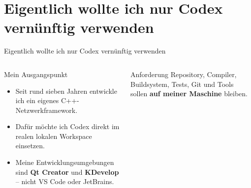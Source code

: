 \documentclass[\fhformat,10pt]{fh-ooe}
\newcommand{\CodexLink}{\href{https://github.com/openai/codex}{OpenAI Codex}}
\begin{document}

\section{Eigentlich wollte ich nur Codex vernünftig verwenden}
\begin{frame}{Eigentlich wollte ich nur Codex vernünftig verwenden}
\begin{columns}[T]
\centering
\vspace{0.75em}
\begin{block}{Mein Ausgangspunkt}
\begin{itemize}
  \item Seit rund sieben Jahren entwickle ich ein eigenes C++-Netzwerkframework.
  \item Dafür möchte ich Codex direkt im realen lokalen Workspace einsetzen.
  \item Meine Entwicklungsumgebungen sind \textbf{Qt Creator} und \textbf{KDevelop} -- nicht VS Code oder JetBrains.
\end{itemize}
\end{block}
\vspace{0.25em}
\begin{alertblock}{Anforderung}
Repository, Compiler, Buildsystem, Tests, Git und Tools sollen \textbf{auf meiner Maschine} bleiben.
\end{alertblock}
\end{columns}
\end{frame}

\end{document}
